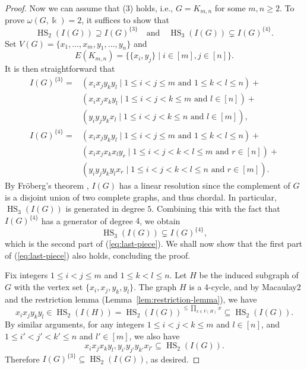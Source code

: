 \documentclass[reqno]{amsart}
\DeclareMathOperator{\HS}{HS}
\theoremstyle{definition}
\theoremstyle{remark}
\numberwithin{equation}{section}
\begin{document}
\begin{proof}
    Now we can assume that (3) holds, i.e., $G=K_{m,n}$ for some $m,n\geq 2$. To prove $\omega(G,\Bbbk)=2$, it suffices to show that
    \begin{equation}\label{eq:last-piece}
        \HS_2(I(G))\supseteq I(G)^{\{3\}}\quad \text{and} \quad \HS_3(I(G))\subsetneq I(G)^{\{4\}}.
    \end{equation}
    Set $V(G)=\{x_1,\dots, x_m, y_1, \dots, y_n\}$ and 
    \[
    E(K_{m,n})=\{ \{x_i,y_j\} \mid  i
    \in [m], j\in [n]\}.
    \]
    It is then straightforward that
    \begin{align*}
        I(G)^{\{3\}} = &(x_ix_jy_ky_l \mid 1\leq i<j \leq m \text{ and } 1\leq k<l\leq n) + \\
        &  (x_ix_jx_ky_l\mid 1\leq i<j <k\leq m \text{ and } l\in [n]) + \\
        &  ( y_iy_jy_kx_l\mid 1\leq i<j <k\leq n \text{ and } l\in [m]), \\
            I(G)^{\{4\}} =& (x_ix_jy_ky_l \mid 1\leq i<j \leq m \text{ and } 1\leq k<l\leq n) + \\
            &(x_ix_jx_kx_ly_r \mid 1\leq i<j<k<l \leq m \text{ and } r\in [n]) +\\
            &(y_iy_jy_ky_lx_r \mid 1\leq i<j<k<l \leq n \text{ and } r\in [m]).
    \end{align*}
    By Fr\"oberg's theorem \cite{Fro}, $I(G)$ has a linear resolution since the complement of $G$ is a disjoint union of two complete graphs, and thus chordal. In particular, $\HS_3(I(G))$ is generated in degree $5$. Combining this with the fact that $I(G)^{\{4\}}$ has a generator of degree $4$, we obtain
    \[
    \HS_3(I(G))\subsetneq I(G)^{\{4\}},
    \]
    which is the second part of (\ref{eq:last-piece}). We shall now show that the first part of (\ref{eq:last-piece}) also holds, concluding the proof.

    Fix integers $1\leq i<j\leq m$ and $1\leq k<l\leq n$. Let $H$ be the induced subgraph of $G$ with the vertex set $\{x_i,x_j,y_k,y_l\}$. The graph $H$ is a 4-cycle, and by Macaulay2 \cite{M2} and the restriction lemma (Lemma~\ref{lem:restriction-lemma}), we have
    \[
    x_ix_jy_ky_l \in \HS_2(I(H)) =\HS_2(I(G))^{\leq \prod_{x\in V(H)}x }\subseteq \HS_2(I(G)).
    \]
    By similar arguments, for any integers $1\leq i<j<k\leq m$ and $l\in [n]$, and $1\leq i'<j'<k'\leq n$ and $l'\in [m]$, we also have
    \[
    x_ix_jx_ky_l, y_{i'}y_{j'}y_{k'}x_{l'}\subseteq \HS_2(I(G)).
    \]
    Therefore $I(G)^{\{3\}}\subseteq \HS_2(I(G))$, as desired.
\end{proof}
\end{document}
